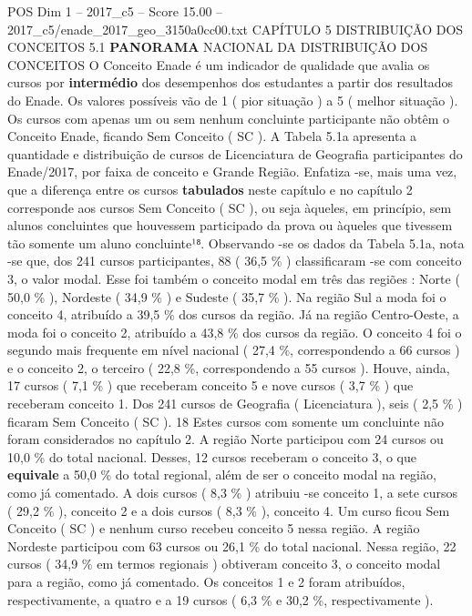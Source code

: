 \begin{textsample}{POS Dim 1 – 2017\_c5 – Score 15.00 – 2017\_c5/enade\_2017\_geo\_3150a0cc00.txt}  \label{ex:f1_pos_058}
CAPÍTULO 5 DISTRIBUIÇÃO DOS CONCEITOS 5.1 \textbf{PANORAMA} NACIONAL DA DISTRIBUIÇÃO DOS CONCEITOS O Conceito Enade é um indicador de qualidade que avalia os cursos por \textbf{intermédio} dos desempenhos dos estudantes a partir dos resultados do Enade.
Os valores possíveis vão de 1 ( pior situação ) a 5 ( melhor situação ).
Os cursos com apenas um ou sem nenhum concluinte participante não obtêm o Conceito Enade, ficando Sem Conceito ( SC ).
A Tabela 5.1a apresenta a quantidade e distribuição de cursos de Licenciatura de Geografia participantes do Enade/2017, por faixa de conceito e Grande Região.
Enfatiza -se, mais uma vez, que a diferença entre os cursos \textbf{tabulados} neste capítulo e no capítulo 2 corresponde aos cursos Sem Conceito ( SC ), ou seja àqueles, em princípio, sem alunos concluintes que houvessem participado da prova ou àqueles que tivessem tão somente um aluno concluinte¹⁸.
Observando -se os dados da Tabela 5.1a, nota -se que, dos 241 cursos participantes, 88 ( 36,5 \% ) classificaram -se com conceito 3, o valor modal.
Esse foi também o conceito modal em três das regiões : Norte ( 50,0 \% ), Nordeste ( 34,9 \% ) e Sudeste ( 35,7 \% ).
Na região Sul a moda foi o conceito 4, atribuído a 39,5 \% dos cursos da região.
Já na região Centro-Oeste, a moda foi o conceito 2, atribuído a 43,8 \% dos cursos da região.
O conceito 4 foi o segundo mais frequente em nível nacional ( 27,4 \%, correspondendo a 66 cursos ) e o conceito 2, o terceiro ( 22,8 \%, correspondendo a 55 cursos ).
Houve, ainda, 17 cursos ( 7,1 \% ) que receberam conceito 5 e nove cursos ( 3,7 \% ) que receberam conceito 1.
Dos 241 cursos de Geografia ( Licenciatura ), seis ( 2,5 \% ) ficaram Sem Conceito ( SC ). 18 Estes cursos com somente um concluinte não foram considerados no capítulo 2.
A região Norte participou com 24 cursos ou 10,0 \% do total nacional.
Desses, 12 cursos receberam o conceito 3, o que \textbf{equivale} a 50,0 \% do total regional, além de ser o conceito modal na região, como já comentado.
A dois cursos ( 8,3 \% ) atribuiu -se conceito 1, a sete cursos ( 29,2 \% ), conceito 2 e a dois cursos ( 8,3 \% ), conceito 4.
Um curso ficou Sem Conceito ( SC ) e nenhum curso recebeu conceito 5 nessa região.
A região Nordeste participou com 63 cursos ou 26,1 \% do total nacional.
Nessa região, 22 cursos ( 34,9 \% em termos regionais ) obtiveram conceito 3, o conceito modal para a região, como já comentado.
Os conceitos 1 e 2 foram atribuídos, respectivamente, a quatro e a 19 cursos ( 6,3 \% e 30,2 \%, respectivamente ).

\end{textsample}
